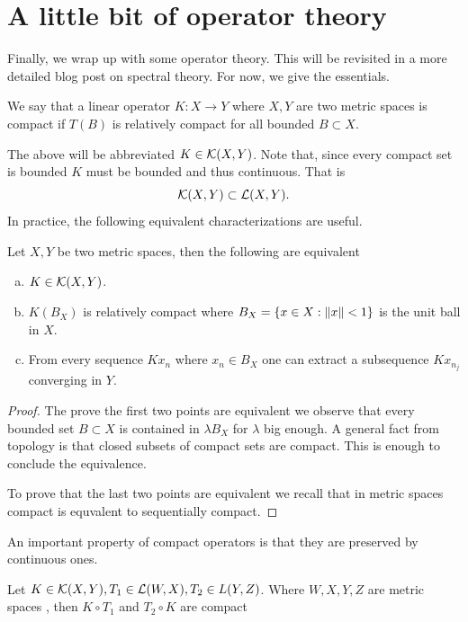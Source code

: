 \documentclass[
    a4paper,
    DIV=14,
    abstract=true,
    numbers=noenddot
]{scrartcl}
\begin{document}
	\section{A little bit of operator theory}
	Finally, we wrap up with some operator theory. This will be revisited in a more detailed blog post on spectral theory. For now, we give the essentials.
	\begin{definition}
		We say that a linear operator $K: X \to Y$ where $X,Y$ are two metric spaces is compact  if  $T(B)$ is relatively compact for all bounded  $B \subset  X$.
	\end{definition}
	The above will be abbreviated $K \in  \mathcal{K}(X,Y)$. Note that, since every compact set is bounded $K$ must be bounded and thus continuous. That is 
\begin{equation*}
    \mathcal{K}(X,Y)\subset \mathcal{L}(X,Y).
\end{equation*}
  In practice, the following equivalent characterizations are useful. 
  \begin{proposition}\label{equivalent}
  Let $X,Y$ be two metric spaces, then the following are equivalent
  \begin{enumerate}[a)]
    \item $K \in \mathcal{K}(X,Y)$. 
    \item $K(B_X)$ is relatively compact where  $B_X=\{ x \in X : \left\lVert x \right\rVert<1\} $ is the unit ball in $X$. 
    \item From every sequence  $Kx_n$ where  $x_n \in B_X$ one can extract a subsequence $K {x_{n_j}}$ converging in $Y$.
\end{enumerate}
\end{proposition}
 \begin{proof}
     The prove the first two points are equivalent we observe that every bounded set $B \subset  X$ is contained in $\lambda B_X$ for $\lambda $ big enough. A general fact from topology is that closed subsets of compact sets are compact. This is enough to conclude the equivalence. 

     To prove that the last two points are equivalent we recall that in metric spaces compact is equvalent to sequentially compact.
 \end{proof}
  An important property of compact operators is that they are preserved by continuous ones.
	\begin{proposition}\label{comp}Let $K \in \mathcal{K}(X,Y), T_1\in \mathcal{L}(W,X), T_2 \in L(Y,Z)$. Where $W,X,Y,Z$ are metric spaces , then $K\circ T_1$ and $T_2 \circ K$ are compact
	\end{proposition}
\end{document}
